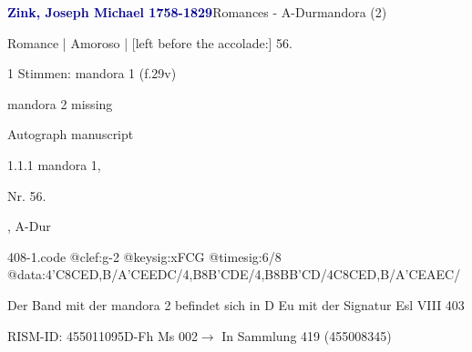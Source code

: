 \documentclass[twocolumn, 12pt]{book}
\begin{document}
\par \vspace{16pt} \textcolor{darkblue}{\textbf{Zink, Joseph Michael  1758-1829}}\hfillplus{\textbf{[408]}}\newline Romances - A-Dur\newline mandora (2)
\par \begin{itshape}[f.29v, at left:] Romance | Amoroso | [left before the accolade:] 56.\end{itshape} 
\par \textcolor{darkblue}{}  1 Stimmen: mandora 1  (f.29v)\newline \begin{small} mandora 2 missing\end{small} \newline Autograph manuscript
\par 1.1.1  mandora 1, \begin{itshape}Nr. 56.\end{itshape}, A-Dur  
\begin{filecontents*}{408-1.code}
@clef:g-2
@keysig:xFCG
@timesig:6/8
@data:4'C8CED,B/A'CEEDC/4,B8B'CDE/4,B8BB'CD/4C8CED,B/A'CEAEC/
\end{filecontents*}
\newline %
\par Der Band mit der mandora 2 befindet sich in D Eu mit der Signatur Esl VIII 403
\par RISM-ID: 455011095\newline D-Fh  Ms 002\newline $\rightarrow$ In Sammlung 419 (455008345)
      
\end{document}

